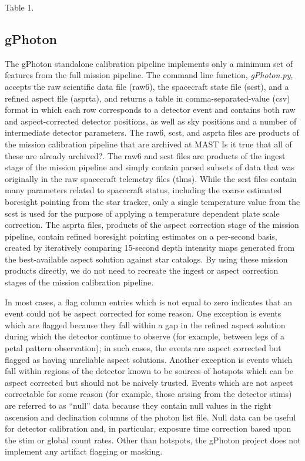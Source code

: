 \documentclass[preprint]{aastex}
\begin{document}
{\color{red}Table 1.}

\subsection{gPhoton}
The gPhoton standalone calibration pipeline implements only a minimum set of features from the full mission pipeline. The command line function, \textit{gPhoton.py}, accepts the raw scientific data file (raw6), the spacecraft state file (scst), and a refined aspect file (asprta), and returns a table in comma-separated-value (csv) format in which each row corresponds to a detector event and contains both raw and aspect-corrected detector positions, as well as sky positions and a number of intermediate detector parameters. The raw6, scst, and asprta files are products of the mission calibration pipeline that are archived at MAST {\color{red}Is it true that all of these are already archived?}. The raw6 and scst files are products of the ingest stage of the mission pipeline and simply contain parsed subsets of data that was originally in the raw spacecraft telemetry files (tlms). While the scst files contain many parameters related to spacecraft status, including the coarse estimated boresight pointing from the star tracker, only a single temperature value from the scst is used for the purpose of applying a temperature dependent plate scale correction. The asprta files, products of the aspect correction stage of the mission pipeline, contain refined boresight pointing estimates on a per-second basis, created by iteratively comparing 15-second depth intensity maps generated from the best-available aspect solution against star catalogs. By using these mission products directly, we do not need to recreate the ingest or aspect correction stages of the mission calibration pipeline.

In most cases, a flag column entries which is not equal to zero indicates that an event could not be aspect corrected for some reason. One exception is events which are flagged because they fall within a gap in the refined aspect solution during which the detector continue to observe (for example, between legs of a petal pattern observation); in such cases, the events are aspect corrected but flagged as having unreliable aspect solutions. Another exception is events which fall within regions of the detector known to be sources of hotspots which can be aspect corrected but should not be naively trusted. Events which are not aspect correctable for some reason (for example, those arising from the detector stims) are referred to as “null” data because they contain null values in the right ascension and declination columns of the photon list file. Null data can be useful for detector calibration and, in particular, exposure time correction based upon the stim or global count rates. Other than hotspots, the gPhoton project does not implement any artifact flagging or masking.
\end{document}

